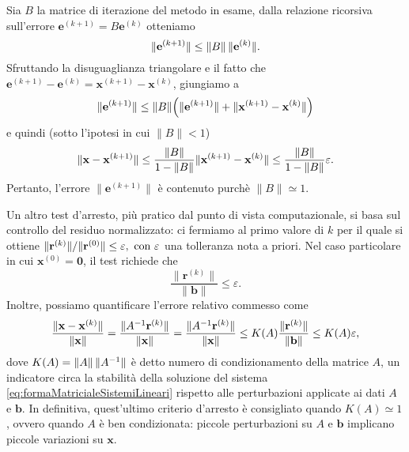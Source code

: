 Sia $B$ la matrice di iterazione del metodo in esame, dalla relazione ricorsiva sull'errore $\mathbf{e}^{(k+1)}= B\mathbf{e}^{(k)}$ otteniamo
\begin{equation}
    \lVert\mathbf{e}^{(k+1)}\rVert \le \lVert B\rVert\,\lVert\mathbf{e}^{(k)}\rVert.
\end{equation}
Sfruttando la disuguaglianza triangolare e il fatto che $\mathbf{e}^{(k+1)} - \mathbf{e}^{(k)} = \mathbf{x}^{(k+1)} - \mathbf{x}^{(k)}$, giungiamo a
\begin{equation*}
    \lVert\mathbf{e}^{(k+1)}\rVert \le \lVert B\rVert\Big(\lVert\mathbf{e}^{(k+1)}\rVert + \lVert\mathbf{x}^{(k+1)} - \mathbf{x}^{(k)}\rVert\Big)
\end{equation*}
e quindi (sotto l'ipotesi in cui $\|B\|<1$)
\begin{equation}
    \lVert\mathbf{x} - \mathbf{x}^{(k+1)}\rVert\le \frac{\lVert B\rVert}{1 - \lVert B\rVert}\lVert\mathbf{x}^{(k+1)} - \mathbf{x}^{(k)}\rVert \le  \frac{\lVert B\rVert}{1 - \lVert B\rVert} \varepsilon.
\end{equation}
Pertanto, l'errore  $\|\mathbf{e}^{(k+1)}\|$ \`e contenuto purch\`e $\|B\|\simeq 1$.

Un altro test d'arresto, pi\`u pratico dal punto di vista computazionale, si basa sul controllo del residuo normalizzato: ci fermiamo al primo valore di $k$
per il quale si ottiene $\lVert\mathbf{r}^{(k)}\rVert/{\lVert\mathbf{r}^{(0)}\rVert} \le \varepsilon, \text{ con } \varepsilon$ una tolleranza nota a priori.\newline
Nel caso particolare in cui $\mathbf{x}^{(0)} = \mathbf{0}$, il test richiede che
\begin{equation*}
    \frac{\|\mathbf{r}^{(k)}\|}{\|\mathbf{b}\|} \le \varepsilon.
\end{equation*}
Inoltre, possiamo quantificare l'errore relativo commesso come
\begin{equation*}
    \frac{\lVert\mathbf{x}-\mathbf{x}^{(k)}\rVert}{\lVert\mathbf{x}\rVert} = \frac{\lVert A^{-1}\mathbf{r}^{(k)}\rVert}{\lVert\mathbf{x}\rVert} = \frac{\lVert A^{-1}\mathbf{r}^{(k)}\rVert}{\lVert\mathbf{x}\rVert} \le K(A) \frac{\lVert\mathbf{r}^{(k)}\rVert}{\lVert\mathbf{b}\rVert} \le K(A)\varepsilon,
\end{equation*}
dove $K(A)=\lVert A\rVert\,\lVert A^{-1}\rVert$ \`e detto numero di condizionamento della matrice $A$, un indicatore circa la stabilit\`a della soluzione del sistema \eqref{eq:formaMatricialeSistemiLineari} rispetto alle perturbazioni applicate ai dati $A$ e $\mathbf{b}$.\newline
In definitiva, quest'ultimo criterio d'arresto \`e consigliato quando $K(A)\simeq 1$, ovvero quando $A$ \`e ben condizionata: piccole perturbazioni su $A \text{ e } \mathbf{b}$ implicano piccole variazioni su $\mathbf{x}$.